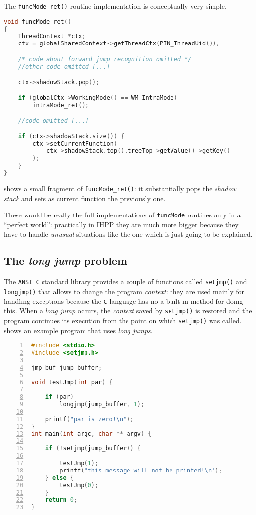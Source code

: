 \documentclass[a4paper,10pt]{report}
\begin{document}
The \verb|funcMode_ret()| routine implementation is conceptually very simple.

\begin{lstlisting}[language=C++,
	caption={a fragment of \texttt{funcMode\_ret()} routine},
	label=funcret, frame=leftline]
void funcMode_ret()
{
	ThreadContext *ctx;
	ctx = globalSharedContext->getThreadCtx(PIN_ThreadUid());

	/* code about forward jump recognition omitted */
	//other code omitted [...]

	ctx->shadowStack.pop();

	if (globalCtx->WorkingMode() == WM_IntraMode)
		intraMode_ret();

	//code omitted [...]

	if (ctx->shadowStack.size()) {
		ctx->setCurrentFunction(
			ctx->shadowStack.top().treeTop->getValue()->getKey()
		);
	}
}
\end{lstlisting}

\noindent
{} shows a small fragment of \verb|funcMode_ret()|:
it substantially pops the \emph{shadow stack} and sets as current function
the previously one.

These would be really the full implementations of \verb|funcMode| routines
only in a ``perfect world'': practically in IHPP they are much more bigger
because they have to handle \emph{unusual} situations like the one
which is just going to be explained.

\subsection{The \emph{long jump} problem}

The \verb|ANSI C| standard library provides a couple of functions called
\verb|setjmp()| and \verb|longjmp()| that allows to change the program \emph{context}:
they are used mainly for handling exceptions because the \verb|C| language
has no a built-in method for doing this.
When a \emph{long jump} occurs, the \emph{context} saved by \verb|setjmp()| is restored
and the program continues its execution from the point on which \verb|setjmp()| was called.
 shows an example program that uses \emph{long jumps}.

\begin{lstlisting}[language=C++,
	caption={source code of \texttt{prog7.c}},
	label=longjmp1, frame=leftline, numbers=left, showstringspaces=false]
#include <stdio.h>
#include <setjmp.h>

jmp_buf jump_buffer;

void testJmp(int par) {

	if (par)
		longjmp(jump_buffer, 1);

	printf("par is zero!\n");
}
int main(int argc, char ** argv) {

	if (!setjmp(jump_buffer)) {

		testJmp(1);
		printf("this message will not be printed!\n");
	} else {
		testJmp(0);
	}
	return 0;
}
\end{lstlisting}
\end{document}
